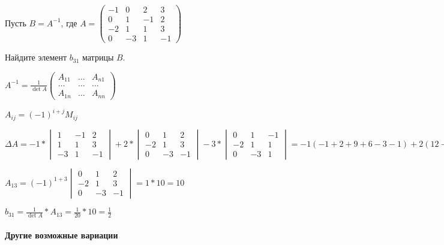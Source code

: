 \documentclass{article}
\begin{document}
\begin{flushleft}

Пусть $B = A^{-1}$, где $A = \begin{pmatrix}
    -1 & 0 & 2 & 3 \\
    0 & 1 & -1 & 2 \\
    -2 & 1 & 1 & 3 \\
    0 & -3 & 1 & -1
\end{pmatrix}$

Найдите элемент $b_{31}$ матрицы $B$.

\bigskip

$A^{-1} = \frac{1}{\det A} \begin{pmatrix}
    A_{11} & \dots & A_{n 1} \\
    \dots & \dots & \dots \\
    A_{1 n} & \dots & A_{n n}
\end{pmatrix}$

$A_{i j} = (-1)^{i + j} M_{i j}$

$\Delta A = -1 * \begin{vmatrix}
    1 & -1 & 2 \\
    1 & 1 & 3 \\
    -3 & 1 & -1
\end{vmatrix} + 2 * \begin{vmatrix}
    0 & 1 & 2 \\
    -2 & 1 & 3 \\
    0 & -3 & -1
\end{vmatrix} - 3 * \begin{vmatrix}
    0 & 1 & -1 \\
    -2 & 1 & 1 \\
    0 & -3 & 1
\end{vmatrix} = -1 (-1 + 2 + 9 + 6 - 3 - 1) + 2 (12 - 2) - 3 (-6 + 2) = -12 + 20 + 12 = 20$

\bigskip

$A_{13} = (-1)^{1 + 3} \begin{vmatrix}
    0 & 1 & 2 \\
    -2 & 1 & 3 \\
    0 & -3 & -1
\end{vmatrix} = 1 * 10 = 10$

$b_{31} = \frac{1}{\det A} * A_{13} = \frac{1}{20} * 10 = \frac{1}{2}$

\paragraph{Другие возможные вариации}


\end{flushleft}
\end{document}
